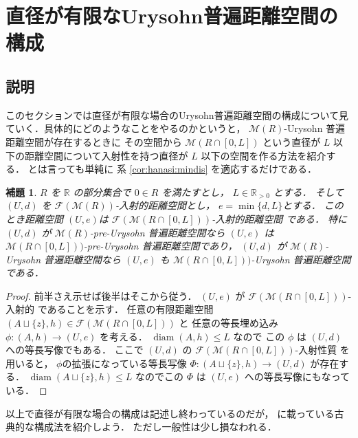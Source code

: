 \documentclass[leqno, 12pt]{jsarticle}
\newtheorem{lem}[thm]{補題}
\newcommand{\rr}{\mathbb{R}}
\DeclareMathOperator{\di}{diam}
\begin{document}
\newpage
\section{直径が有限なUrysohn普遍距離空間の構成}\label{sec:yuugen}
\subsection{説明}
このセクションでは直径が有限な場合のUrysohn普遍距離空間の構成について見ていく．具体的にどのようなことをやるのかというと，
$\mathscr{M}(R)$-Urysohn
普遍距離空間が存在するときに
その空間から
$\mathscr{M}(R\cap [0, L])$
という直径が
$L$
以下の距離空間について入射性を持つ直径が
$L$
以下の空間を作る方法を紹介する．
とは言っても単純に
系 
\ref{cor:hanasi:mindis}
を適応するだけである．



\begin{lem}\label{lem:diam:restrict}
$R$
を
$\rr$
の部分集合で
$0\in R$
を満たすとし，
$L\in \rr_{>0}$
とする．
そして
$(U, d)$
を
$\mathscr{F}(\mathscr{M}(R))$-入射的距離空間とし，
$e=\min\{d, L\}$とする．
このとき距離空間
$(U, e)$は
$\mathscr{F}(\mathscr{M}(R\cap [0, L]))$-入射的距離空間
である．
特に
$(U, d)$
が
$\mathscr{M}(R)$-pre-Urysohn
普遍距離空間なら
$(U, e)$
は
$\mathscr{M}(R\cap [0, L]))$-pre-Urysohn
普遍距離空間であり，
$(U, d)$
が
$\mathscr{M}(R)$-Urysohn
普遍距離空間なら
$(U, e)$
も
$\mathscr{M}(R\cap [0, L]))$-Urysohn
普遍距離空間
である．
\end{lem}
\begin{proof}
前半さえ示せば後半はそこから従う．
$(U, e)$
が
$\mathscr{F}(\mathscr{M}(R\cap [0, L]))$-入射的
であることを示す．
任意の有限距離空間
$(A\sqcup\{z\}, h)\in \mathscr{F}(
\mathscr{M}(R\cap [0, L]))$
と
任意の等長埋め込み
$\phi\colon  (A, h)\to (U,  e)$
を考える．
$\di(A, h)\le L$
なので
この
$\phi$
は
$(U, d)$
への等長写像でもある．
ここで
$(U, d)$
の
$\mathscr{F}(\mathscr{M}(R\cap [0, L]))$-入射性質
を用いると，
$\phi$の拡張になっている等長写像
$\Phi\colon  (A\sqcup\{z\}, h)\to (U, d)$
が存在する．
$\di(A\sqcup\{z\}, h)\le L$
なのでこの
$\Phi$
は
$(U, e)$
への等長写像にもなっている．
\end{proof}


以上で直径が有限な場合の構成は記述し終わっているのだが，
\cite{Ury2}
に載っている古典的な構成法を紹介しよう．
ただし一般性は少し損なわれる．
\end{document}
